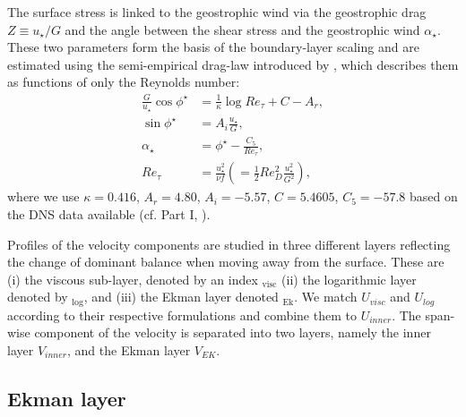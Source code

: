 \documentclass[a4paper,11pt]{article}
\begin{document}

The surface stress is linked to the geostrophic wind via the geostrophic drag $Z\equiv u_\star/G$ and the angle between the shear stress and the geostrophic wind $\alpha_\star$. These two parameters form the basis of the boundary-layer scaling and are  estimated using the semi-empirical drag-law introduced by \cite{spalart1989theoretical}, which describes them as functions of only the Reynolds number:
\begin{subequations}\label{eqn:drag}
	\begin{align}
		\frac{G}{u_\star}\cos\phi^\star &= \frac{1}{\kappa}\log Re_\tau + C - A_r, \\
		\sin\phi^\star &= A_i\frac{u_\star}{G},\\
		\alpha_\star &= \phi^\star - \frac{C_5}{Re_\tau},\\
		Re_\tau &= \frac{u_\star^2}{\nu f} \left( = \frac{1}{2} Re_{D}^2 \frac{u_{\star}^2}{G^2}\right),
	\end{align}
\end{subequations}
where we use $\kappa = 0.416$, $A_r = 4.80$, $A_i = -5.57$, $C = 5.4605$, $C_5 = -57.8$ based on the DNS data available (cf. Part I, \cite{ansorge2014global}).


Profiles of the velocity components are studied in three different layers reflecting the change of dominant balance when moving away from the surface. These are (i) the viscous sub-layer, denoted by an index $_\text{visc}$ (ii) the logarithmic layer denoted by $_\text{log}$, and (iii) the Ekman layer denoted $_\text{Ek}$. We match $U_{visc}$ and $U_{log}$ according to their respective formulations and combine them to $U_{inner}$. The span-wise component of the velocity is separated into two layers, namely the inner layer $V_{inner}$, and the Ekman layer $V_{EK}$. 

\subsection{Ekman layer}
\end{document}
